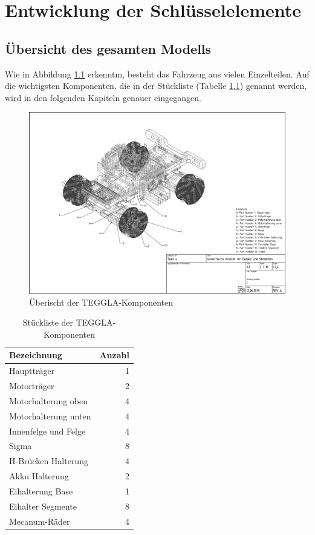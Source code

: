 \chapter{Entwicklung der Schlüsselelemente}
\section{Übersicht des gesamten Modells}
Wie in Abbildung \ref{bild:tegglaoverview} erkenntm, besteht das Fahrzeug aus vielen Einzelteilen. 
Auf die wichtigsten Komponenten, die in der Stückliste (Tabelle \ref{table:tegglaoverview}) genannt werden, wird in den folgenden Kapiteln genauer eingegangen.
\begin{figure}[!ht]
	\centering
	\includegraphics[width=\textwidth]{bilder/overview.png}
	\caption{Überischt der TEGGLA-Komponenten}
	\label{bild:tegglaoverview}
\end{figure}

\begin{table}[!ht]
\centering
\begin{tabular}{lr}
	Bezeichnung & Anzahl \\ 
	\midrule[3pt] 
	Hauptträger            & 1 \\ \midrule
	Motorträger            & 2 \\ \midrule
	Motorhalterung oben    & 4 \\ \midrule
	Motorhalterung unten   & 4 \\ \midrule
	Innenfelge und Felge   & 4 \\ \midrule
	Sigma                  & 8 \\ \midrule
	H-Brücken Halterung    & 4 \\ \midrule
	Akku Halterung         & 2 \\ \midrule
	Eihalterung Base       & 1 \\ \midrule
	Eihalter Segmente      & 8 \\ \midrule
	Mecanum-Räder          & 4
\end{tabular} 
\caption{Stückliste der TEGGLA-Komponenten} 
\label{table:tegglaoverview}
\end{table} 



